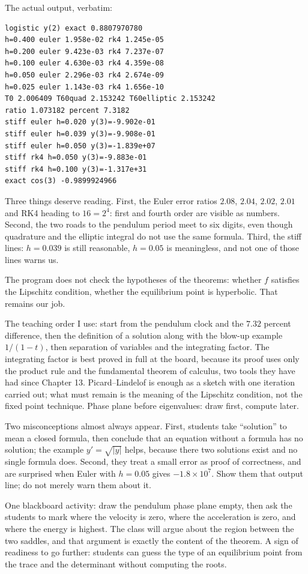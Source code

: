The actual output, verbatim:

\begin{verbatim}
logistic y(2) exact 0.8807970780
h=0.400 euler 1.958e-02 rk4 1.245e-05
h=0.200 euler 9.423e-03 rk4 7.237e-07
h=0.100 euler 4.630e-03 rk4 4.359e-08
h=0.050 euler 2.296e-03 rk4 2.674e-09
h=0.025 euler 1.143e-03 rk4 1.656e-10
T0 2.006409 T60quad 2.153242 T60elliptic 2.153242
ratio 1.073182 percent 7.3182
stiff euler h=0.020 y(3)=-9.902e-01
stiff euler h=0.039 y(3)=-9.908e-01
stiff euler h=0.050 y(3)=-1.839e+07
stiff rk4 h=0.050 y(3)=-9.883e-01
stiff rk4 h=0.100 y(3)=-1.317e+31
exact cos(3) -0.9899924966
\end{verbatim}

Three things deserve reading. First, the Euler error ratios $2.08$, $2.04$, $2.02$,
$2.01$ and RK4 heading to $16=2^{4}$: first and fourth order are visible as numbers. Second,
the two roads to the pendulum period meet to six digits, even though quadrature and the
elliptic integral do not use the same formula. Third, the stiff lines: $h=0.039$
is still reasonable, $h=0.05$ is meaningless, and not one of those lines warns
us.

The program does not check the hypotheses of the theorems: whether $f$ satisfies the Lipschitz
condition, whether the equilibrium point is hyperbolic. That remains our job.

\begin{untukdosen}
The teaching order I use: start from the pendulum clock and the $7.32$
percent difference, then the definition of a solution along with the blow-up example
$1/(1-t)$, then separation of variables and the integrating factor. The integrating factor is
best proved in full at the board, because its proof uses only the product rule and the
fundamental theorem of calculus, two tools they have had since Chapter 13. Picard--Lindelof is
enough as a sketch with one iteration carried out; what must remain is the meaning of the
Lipschitz condition, not the fixed point technique. Phase plane before eigenvalues:
draw first, compute later.

Two misconceptions almost always appear. First, students take
``solution'' to mean a closed formula, then conclude that an equation without a formula has no
solution; the example $y'=\sqrt{|y|}$ helps, because there two solutions exist and
no single formula does. Second, they treat a small error as proof of correctness, and are
surprised when Euler with $h=0.05$ gives $-1.8\times10^{7}$.
Show them that output line; do not merely warn them about it.

One blackboard activity: draw the pendulum phase plane empty, then ask
the students to mark where the velocity is zero, where the acceleration is zero, and where the
energy is highest. The class will argue about the region between the two saddles, and that
argument is exactly the content of the theorem. A sign of readiness to go further: students
can guess the type of an equilibrium point from the trace and the determinant without
computing the roots.

\end{untukdosen}

